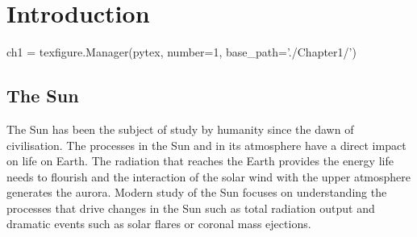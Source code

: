 \label{ch:Intro}
\chapter{Introduction}  %

\begin{pycode}[chapter1]
ch1 = texfigure.Manager(pytex, number=1, base_path='./Chapter1/')
\end{pycode}

%
%


\section{The Sun} %
The Sun has been the subject of study by humanity since the dawn of civilisation.
The processes in the Sun and in its atmosphere have a direct impact on life on Earth.
The radiation that reaches the Earth provides the energy life needs to flourish and the interaction of the solar wind with the upper atmosphere generates the aurora.
Modern study of the Sun focuses on understanding the processes that drive changes in the Sun such as total radiation output and dramatic events such as solar flares or coronal mass ejections.

